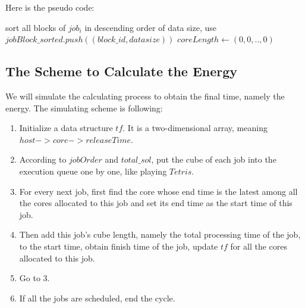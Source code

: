 \documentclass{llncs}
\begin{document}
	Here is the pseudo code: \\
	\begin{algorithm}[H]
		\BlankLine
		\caption{$greedy\_allocation(job_i)$} \label{Alg-greedy}
		sort all blocks of $job_i$ in descending order of data size, use $jobBlock\_sorted.push((block\_id, datasize))$\;
		$coreLength \leftarrow (0,0,..,0)$\;
	\end{algorithm}
	
	\subsection{The Scheme to Calculate the Energy} \label{subsec-energy}
	We will simulate the calculating process to obtain the final time, namely the energy. The simulating scheme is following: 
	\begin{enumerate}
		\item Initialize a data structure $tf$. It is a two-dimensional array, meaning $host->core->releaseTime$.
		\item According to $jobOrder$ and $total\_sol$, put the cube of each job into the execution queue one by one, like playing $Tetris$.
		\item For every next job, first find the core whose end time is the latest among all the cores allocated to this job and set its end time as the start time of this job.
		\item Then add this job's cube length, namely the total processing time of the job, to the start time, obtain finish time of the job, update $tf$ for all the cores allocated to this job.
		\item Go to 3.
		\item If all the jobs are scheduled, end the cycle. 
	\end{enumerate} 
	
\end{document}
